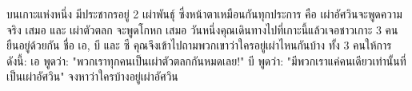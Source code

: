 ﻿%
\question บนเกาะแห่งหนึ่ง มีประชากรอยู่ 2 เผ่าพันธุ์ ซึ่งหน้าตาเหมือนกันทุกประการ คือ เผ่าอัศวินจะพูดความจริง เสมอ และ เผ่าตัวตลก จะพูดโกหก เสมอ 
วันหนึ่งคุณเดินทางไปที่เกาะนี้แล้วเจอชาวเกาะ 3 คน ยืนอยู่ด้วยกัน ชื่อ เอ, บี และ ซี คุณจึงเข้าไปถามพวกเขาว่าใครอยู่เผ่าไหนกันบ้าง ทั้ง 3 คนให้การดังนี้: \newline
เอ พูดว่า: "พวกเราทุกคนเป็นเผ่าตัวตลกกันหมดเลย!" \newline
บี พูดว่า: "มีพวกเราแค่คนเดียวเท่านั้นที่เป็นเผ่าอัศวิน" \newline
จงหาว่าใครบ้างอยู่เผ่าอัศวิน
\newline
{}
